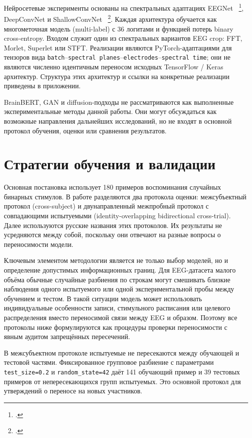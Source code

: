 Нейросетевые эксперименты основаны на спектральных адаптациях EEGNet
~\footcite{10.1088/1741-2552/aace8c}, DeepConvNet и ShallowConvNet
~\footcite{10.1002/hbm.23730}. Каждая архитектура обучается как многометочная
модель (multi-label)
с 36 логитами и функцией потерь binary cross-entropy. Входом служит один из
спектральных вариантов EEG crop: FFT, Morlet, Superlet или STFT. Реализации
являются PyTorch-адаптациями для тензоров вида
\texttt{batch}--\texttt{spectral planes}--\texttt{electrodes}--\texttt{spectral
time}; они не являются численно идентичным переносом исходных TensorFlow / Keras
архитектур. Структура этих архитектур и ссылки на конкретные реализации
приведены в приложении.

BrainBERT, GAN и diffusion-подходы не рассматриваются как выполненные
экспериментальные методы данной работы. Они могут обсуждаться как возможные
направления дальнейших исследований, но не входят в основной протокол
обучения, оценки или сравнения результатов.

\section{Стратегии обучения и валидации}

Основная постановка использует 180 примеров воспоминания случайных бинарных
стимулов. В работе разделяются два протокола оценки: межсубъектный протокол
(cross-subject) и двунаправленный межпробный протокол с совпадающими
испытуемыми (identity-overlapping bidirectional cross-trial). Далее
используются русские названия этих протоколов. Их результаты не усредняются
между собой, поскольку они отвечают на разные вопросы о переносимости модели.

Ключевым элементом методологии является не только выбор моделей, но и
определение допустимых информационных границ. Для EEG-датасета малого объёма
обычные случайные разбиения по строкам могут смешивать близкие наблюдения
одного испытуемого или одной экспериментальной пробы между обучением и тестом.
В такой ситуации модель может использовать индивидуальные особенности записи,
стимульного расписания или целевого распределения вместо переносимой связи
между EEG и образом. Поэтому все протоколы ниже формулируются как процедуры
проверки переносимости с явным аудитом запрещённых пересечений.

В межсубъектном протоколе испытуемые не пересекаются между обучающей и
тестовой частями. Фиксированное групповое разбиение с параметрами
\texttt{test\_size=0.2} и \texttt{random\_state=42} даёт 141 обучающий пример и
39 тестовых примеров от непересекающихся групп испытуемых. Это основной
протокол для утверждений о переносе на новых участников.


